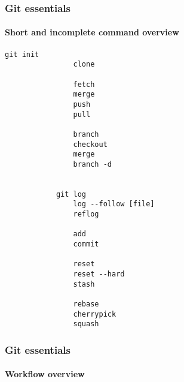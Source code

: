 \documentclass{beamer}
\newcommand{\adjustimg}{%
  \checkoddpage%
  \ifoddpage\hspace*{\dimexpr\evensidemargin-\oddsidemargin}\else\hspace*{-\dimexpr\evensidemargin-\oddsidemargin}\fi%
}
\newcommand{\centerimg}[2][width=\textwidth]{%
  \makebox[\textwidth]{\adjustimg\texttt{[image: \#2]}}%
}
\begin{document}
    \begin{comment}
    \begin{frame}
        \begin{tikzpicture}
            \gitDAG[grow right sep = 2em]{
                A -- B -- {
                  C,
                  D -- E,
                }
            };
            \gittag
                [v0p1]      %
                {v0.1}      %
                {above=of A}%
                {A}         %
            \gitremotebranch
                [originmaster]
                {origin/master}
                {above=of C}
                {C}
            \gitbranch
                {master}
                {above=of E}
                {E}
            \gitHEAD
                {above=of master}
                {master}
        \end{tikzpicture}
    \end{frame}
    \end{comment}
    \begin{frame}[fragile]
        \frametitle{Git essentials}
        \framesubtitle{Short and incomplete command overview}
        \begin{multicols}{2}
        \begin{lstlisting}[gobble=12]
            git init                
                clone

                fetch
                merge
                push
                pull

                branch
                checkout
                merge
                branch -d


            git log                
                log --follow [file]
                reflog

                add
                commit

                reset
                reset --hard
                stash

                rebase
                cherrypick
                squash
        \end{lstlisting}
        \end{multicols}
    \end{frame}
    \begin{frame}
        \frametitle{Git essentials}
        \framesubtitle{Workflow overview}
        \noindent\centerimg[width=\textwidth]{workflow.png}
    \end{frame}
\end{document}
